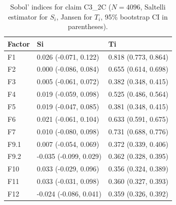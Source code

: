 \begin{table}[ht]
\centering
\caption{Sobol' indices for claim C3_2C ($N=4096$, Saltelli estimator for $S_i$, Jansen for $T_i$, 95\% bootstrap CI in parentheses).} 
\label{tab:sobol_C3_2C}
\begin{tabular}{lll}
  \hline
Factor & Si & Ti \\ 
  \hline
F1 & 0.026 (-0.071, 0.122) & 0.818 (0.773, 0.864) \\ 
  F2 & 0.000 (-0.086, 0.084) & 0.655 (0.614, 0.698) \\ 
  F3 & 0.005 (-0.061, 0.072) & 0.382 (0.348, 0.415) \\ 
  F4 & 0.019 (-0.059, 0.098) & 0.525 (0.486, 0.564) \\ 
  F5 & 0.019 (-0.047, 0.085) & 0.381 (0.348, 0.415) \\ 
  F6 & 0.021 (-0.061, 0.104) & 0.633 (0.591, 0.675) \\ 
  F7 & 0.010 (-0.080, 0.098) & 0.731 (0.688, 0.776) \\ 
  F9.1 & 0.007 (-0.054, 0.069) & 0.372 (0.339, 0.406) \\ 
  F9.2 & -0.035 (-0.099, 0.029) & 0.362 (0.328, 0.395) \\ 
  F10 & 0.033 (-0.029, 0.096) & 0.356 (0.324, 0.389) \\ 
  F11 & 0.033 (-0.031, 0.098) & 0.360 (0.327, 0.393) \\ 
  F12 & -0.024 (-0.086, 0.041) & 0.359 (0.326, 0.392) \\ 
   \hline
\end{tabular}
\end{table}
